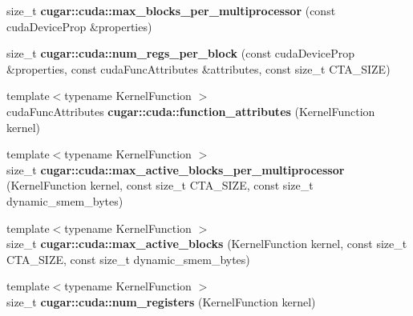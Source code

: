 \begin{DoxyCompactItemize}
\mbox{\label{group___c_u_d_a_module_ga2c9e3ad9b68b00b0e578b347d822710a}} 
size\+\_\+t {\bfseries cugar\+::cuda\+::max\+\_\+blocks\+\_\+per\+\_\+multiprocessor} (const cuda\+Device\+Prop \&properties)
\item 
\mbox{\label{group___c_u_d_a_module_ga4491a8494830e42c9bdbd914dfbfd9e6}} 
size\+\_\+t {\bfseries cugar\+::cuda\+::num\+\_\+regs\+\_\+per\+\_\+block} (const cuda\+Device\+Prop \&properties, const cuda\+Func\+Attributes \&attributes, const size\+\_\+t C\+T\+A\+\_\+\+S\+I\+ZE)
\item 
\mbox{\label{group___c_u_d_a_module_gae5cde2abeb5ac035d280d54208681157}} 
{\footnotesize template$<$typename Kernel\+Function $>$ }\\cuda\+Func\+Attributes {\bfseries cugar\+::cuda\+::function\+\_\+attributes} (Kernel\+Function kernel)
\item 
\mbox{\label{group___c_u_d_a_module_ga3f3b8cc86202f26fb2f0c0ffe769cf46}} 
{\footnotesize template$<$typename Kernel\+Function $>$ }\\size\+\_\+t {\bfseries cugar\+::cuda\+::max\+\_\+active\+\_\+blocks\+\_\+per\+\_\+multiprocessor} (Kernel\+Function kernel, const size\+\_\+t C\+T\+A\+\_\+\+S\+I\+ZE, const size\+\_\+t dynamic\+\_\+smem\+\_\+bytes)
\item 
\mbox{\label{group___c_u_d_a_module_ga46f163975d7b7d95ad728c2b223186a4}} 
{\footnotesize template$<$typename Kernel\+Function $>$ }\\size\+\_\+t {\bfseries cugar\+::cuda\+::max\+\_\+active\+\_\+blocks} (Kernel\+Function kernel, const size\+\_\+t C\+T\+A\+\_\+\+S\+I\+ZE, const size\+\_\+t dynamic\+\_\+smem\+\_\+bytes)
\item 
\mbox{\label{group___c_u_d_a_module_ga8e38d01050b405397c77b5dac6bedf98}} 
{\footnotesize template$<$typename Kernel\+Function $>$ }\\size\+\_\+t {\bfseries cugar\+::cuda\+::num\+\_\+registers} (Kernel\+Function kernel)
\item 
\mbox{\label{group___c_u_d_a_module_ga2df5802920495ea1503bc5ba19dc6634}} 

\end{DoxyCompactItemize}

